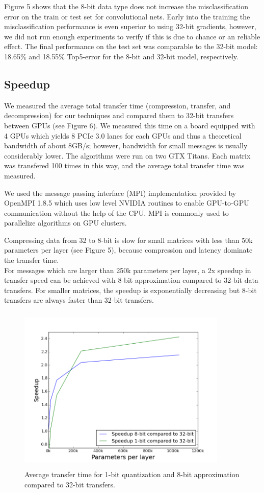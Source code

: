 \documentclass{article} %
\begin{document}
Figure 5 shows that the 8-bit data type does not increase the misclassification error on the train or test set for convolutional nets. Early into the training the misclassification performance is even superior to using 32-bit gradients, however, we did not run enough experiments to verify if this is due to chance or an reliable effect. The final performance on the test set was comparable to the 32-bit model: 18.65\% and 18.55\% Top5-error for the 8-bit and 32-bit model, respectively.

\newpage
\subsection{Speedup}

We measured the average total transfer time (compression, transfer, and decompression) for our techniques and compared them to 32-bit transfers between GPUs (see Figure 6). We measured this time on a board equipped with 4 GPUs which yields 8 PCIe 3.0 lanes for each GPUs and thus a theoretical bandwidth of about 8GB/s; however, bandwidth for small messages is usually considerably lower. The algorithms were run on two GTX Titans. Each matrix was transfered 100 times in this way, and the average total transfer time was measured.

We used the message passing interface (MPI) implementation provided by OpenMPI 1.8.5 which uses low level NVIDIA routines to enable GPU-to-GPU communication without the help of the CPU. MPI is commonly used to parallelize algorithms on GPU clusters.

Compressing data from 32 to 8-bit is slow for small matrices with less than 50k parameters per layer (see Figure 5), because compression and latency dominate the transfer time.\\
For messages which are larger than 250k parameters per layer, a 2x speedup in transfer speed can be achieved with 8-bit approximation compared to 32-bit data transfers. For smaller matrices, the speedup is exponentially decreasing but 8-bit transfers are always faster than 32-bit transfers.

\begin{figure}[htbp]
	\centering
	\includegraphics[width=10cm, height=8cm]{bandwidth_raw_32vs8vs1_speedups.png}
	\caption{Average transfer time for 1-bit quantization and 8-bit approximation compared to 32-bit transfers.  }
	\label{fig:untitled}
\end{figure}
\end{document}
